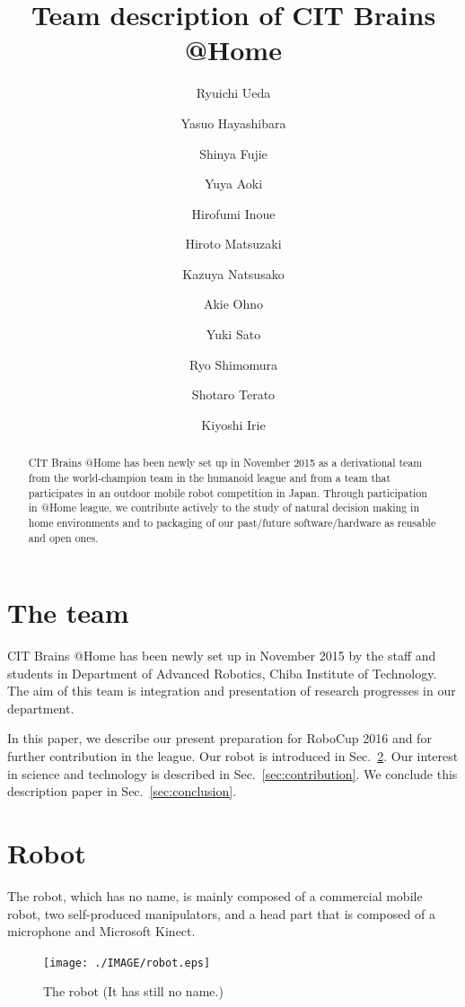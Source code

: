 \documentclass{llncs}
\begin{document}
\title{Team description of CIT Brains @Home}

\author{Ryuichi Ueda \and
Yasuo Hayashibara \and
Shinya Fujie \and
Yuya Aoki \and
Hirofumi Inoue \and
Hiroto Matsuzaki \and
Kazuya Natsusako \and
Akie Ohno \and
Yuki Sato \and
Ryo Shimomura \and
Shotaro Terato \and
Kiyoshi Irie
}


\maketitle
%
\begin{abstract}
CIT Brains @Home has been newly set up in November 2015
as a derivational team from the world-champion team
in the humanoid league and from a team that participates in
an outdoor mobile robot competition in Japan.
Through participation in @Home league,
we contribute actively to the study of natural decision making
in home environments and to packaging of our past/future
software/hardware as reusable and open ones.
\end{abstract}

\section{The team}

CIT Brains @Home has been newly set up in November 2015
by the staff and students in Department of Advanced Robotics,
Chiba Institute of Technology.
The aim of this team is integration and presentation
of research progresses in our department.

In this paper, we describe our present preparation for
RoboCup 2016 and for further contribution in the league.
Our robot is introduced in Sec.~\ref{sec:robot}.
Our interest in science and technology is
described in Sec.~\ref{sec:contribution}.
We conclude this description paper in Sec.~\ref{sec:conclusion}.

\section{Robot}\label{sec:robot}
The robot, which has no name, is mainly composed of a commercial mobile robot,
two self-produced manipulators, and a head part that is composed of
a microphone and Microsoft Kinect.

\begin{figure}[h]
	\begin{center}
		\texttt{[image: ./IMAGE/robot.eps]}
		\caption{The robot (It has still no name.)}
		\label{fig:robot}
	\end{center}
\end{figure}
\end{document}
